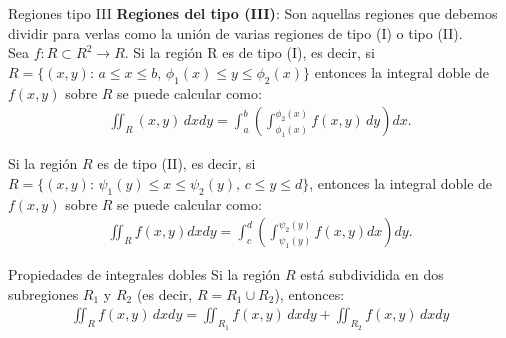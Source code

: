\documentclass[a4paper, twoside]{article}
\numberwithin{equation}{section}
\numberwithin{figure}{section}
\numberwithin{table}{section}
\begin{document}
\begin{definicion*}{Regiones tipo III}
	\textbf{Regiones del tipo (III)}: Son aquellas regiones que debemos dividir para verlas como la unión de varias regiones de tipo (I) o tipo (II).\\

	Sea $f: R \subset R^2 \to R$. Si la región R es de tipo (I), es decir, si $R = \{(x,y):\, a \le x \le b,\,\phi_1(x) \le y\le \phi_2(x)\}$ entonces la integral doble de $f(x,y)$ sobre $R$ se puede calcular como: 
	\begin{align}
		\iint_{R} (x,y)\, dxdy=\int_{a}^{b} \left(\int_{\phi_1(x)}^{\phi_2(x)}f(x,y)\, dy\right)dx.
	\end{align}

	Si la región $R$ es de tipo (II), es decir, si $R=\{(x,y):\,\psi_1(y)\le x\le\psi_2(y),\, c\le y\le d\}$, entonces la integral doble de $f(x,y)$ sobre $R$ se puede calcular como: 
	\begin{align}
		\iint_{R} f(x,y)dxdy=\int_{c}^{d}\left(\int_{\psi_1(y)}^{\psi_2(y)} f(x,y)dx\right)dy.
	\end{align}
\end{definicion*}

\begin{corolario*}{Propiedades de integrales dobles}
	Si la región $R$ está subdividida en dos subregiones $R_1$ y $R_2$ (es decir, $R=R_1 \cup R_2$), entonces:
	\begin{align}
		\iint_{R} f(x,y)\, dxdy=\iint_{R_1} f(x,y)\, dxdy+\iint_{R_2} f(x,y)\, dxdy
	\end{align}
\end{corolario*}
\end{document}
